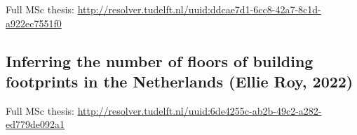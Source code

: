 \begin{kaobox}[frametitle=\faExternalLink\ To read or to watch.]
Full MSc thesis: \url{http://resolver.tudelft.nl/uuid:ddcae7d1-6cc8-42a7-8c1d-a922ec7551f0}
\end{kaobox}

\subsection{Inferring the number of floors of building footprints in the Netherlands (Ellie Roy, 2022)}

\begin{kaobox}[frametitle=\faExternalLink\ To read or to watch.]
Full MSc thesis: \url{http://resolver.tudelft.nl/uuid:6de4255c-ab2b-49c2-a282-ed779de092a1}
\end{kaobox}